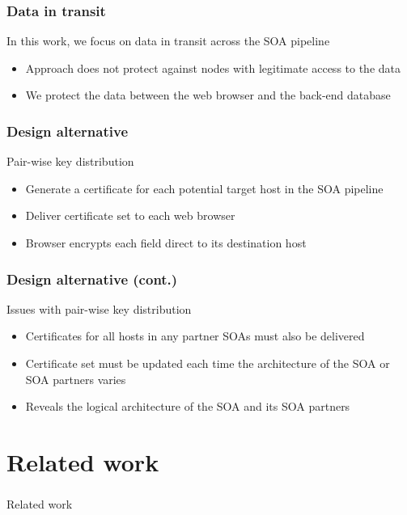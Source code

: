 \documentclass{beamer}
\begin{document}
\begin{frame}
\frametitle{Data in transit}
In this work, we focus on data in transit across the SOA pipeline
\smallskip
\begin{itemize}
\item Approach does not protect against nodes with legitimate access to the data
\item We protect the data between the web browser and the back-end database
\end{itemize}
\end{frame}


\begin{frame}
\frametitle{Design alternative}
Pair-wise key distribution
\smallskip
\begin{itemize}
\item Generate a certificate for each potential target host in the SOA pipeline
\item Deliver certificate set to each web browser
\item Browser encrypts each field direct to its destination host 
\end{itemize}
\end{frame}

\begin{frame}
\frametitle{Design alternative (cont.)}
Issues with pair-wise key distribution
\begin{itemize}
\item Certificates for all hosts in any partner SOAs must also be delivered
\item Certificate set must be updated each time the architecture of the SOA or
SOA partners varies
\item Reveals the logical architecture of the SOA and its SOA partners
\end{itemize}
\end{frame}

\section{Related work}
\begin{frame}
\frametitle{}
\begin{center}
Related work
\end{center}
\end{frame}
\end{document}
